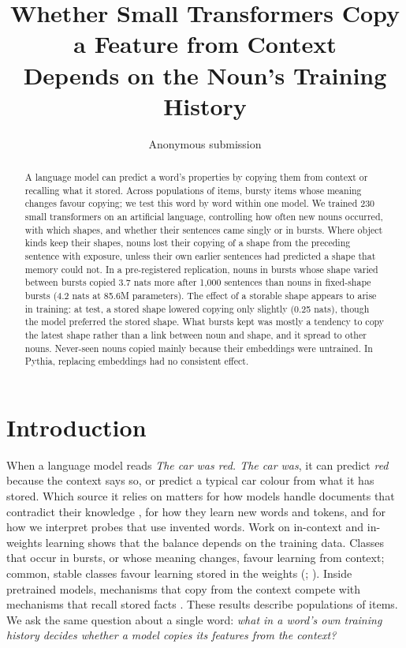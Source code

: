 \documentclass[11pt]{article}
\title{Whether Small Transformers Copy a Feature from Context\\Depends on the Noun's Training History}
\author{Anonymous submission}
\begin{document}
\maketitle

\begin{abstract}
A language model can predict a word's properties by copying them from context or recalling what it stored. Across populations of items, bursty items whose meaning changes favour copying; we test this word by word within one model. We trained 230 small transformers on an artificial language, controlling how often new nouns occurred, with which shapes, and whether their sentences came singly or in bursts. Where object kinds keep their shapes, nouns lost their copying of a shape from the preceding sentence with exposure, unless their own earlier sentences had predicted a shape that memory could not. In a pre-registered replication, nouns in bursts whose shape varied between bursts copied 3.7 nats more after 1,000 sentences than nouns in fixed-shape bursts (4.2 nats at 85.6M parameters). The effect of a storable shape appears to arise in training: at test, a stored shape lowered copying only slightly (0.25 nats), though the model preferred the stored shape. What bursts kept was mostly a tendency to copy the latest shape rather than a link between noun and shape, and it spread to other nouns. Never-seen nouns copied mainly because their embeddings were untrained. In Pythia, replacing embeddings had no consistent effect.
\end{abstract}

\section{Introduction}
When a language model reads \emph{The car was red. The car was}, it can predict \emph{red} because the context says so, or predict a typical car colour from what it has stored. Which source it relies on matters for how models handle documents that contradict their knowledge \citep{longpre2021,xie2024}, for how they learn new words and tokens, and for how we interpret probes that use invented words. Work on in-context and in-weights learning shows that the balance depends on the training data. Classes that occur in bursts, or whose meaning changes, favour learning from context; common, stable classes favour learning stored in the weights (\citealp{chan2022}; \citealp{chan2025}). Inside pretrained models, mechanisms that copy from the context compete with mechanisms that recall stored facts \citep{yu2023,jin2024,ortu2024}. These results describe populations of items. We ask the same question about a single word: \emph{what in a word's own training history decides whether a model copies its features from the context?}
\end{document}
